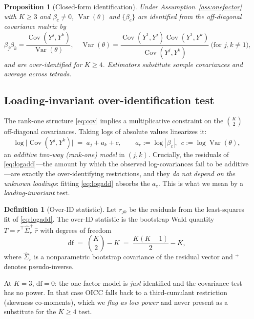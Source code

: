 \documentclass[11pt]{article}
\newtheorem{proposition}{Proposition}
\theoremstyle{definition}
\newtheorem{definition}{Definition}
\theoremstyle{remark}
\newcommand{\Var}{\operatorname{Var}}
\newcommand{\Cov}{\operatorname{Cov}}
\begin{document}
\begin{proposition}[Closed-form identification]\label{prop:ident}
Under Assumption~\ref{ass:onefactor} with $K \ge 3$ and $\beta_c \ne 0$,
$\Var(\theta)$ and $\{\beta_c\}$ are identified from the off-diagonal
covariance matrix by
\[
\beta_j\beta_k = \frac{\Cov(Y^j,Y^k)}{\Var(\theta)},\quad
\Var(\theta) = \frac{\Cov(Y^1,Y^j)\Cov(Y^1,Y^k)}{\Cov(Y^j,Y^k)}\ \text{(for } j,k\ne 1),
\]
and are \emph{over-identified} for $K\ge 4$. Estimators substitute sample
covariances and average across tetrads.
\end{proposition}

\subsection{Loading-invariant over-identification test}\label{sec:overid}

The rank-one structure \eqref{eq:cov} implies a multiplicative constraint on
the $\binom{K}{2}$ off-diagonal covariances. Taking logs of absolute values
linearizes it:
\begin{equation}\label{eq:logadd}
\log\bigl|\Cov(Y^j,Y^k)\bigr| \;=\; a_j + a_k + c,
\qquad a_c := \log|\beta_c|,\ \ c := \log\Var(\theta),
\end{equation}
an \emph{additive two-way (rank-one) model} in $(j,k)$. Crucially, the
residuals of \eqref{eq:logadd}---the amount by which the observed
log-covariances fail to be additive---are exactly the over-identifying
restrictions, and they \emph{do not depend on the unknown loadings}: fitting
\eqref{eq:logadd} absorbs the $a_c$. This is what we mean by a
\emph{loading-invariant} test.

\begin{definition}[Over-ID statistic]\label{def:overid}
Let $r_{jk}$ be the residuals from the least-squares fit of
\eqref{eq:logadd}. The over-ID statistic is the bootstrap Wald quantity
$T = \hat r^\top \widehat{\Sigma}_r^{+}\, \hat r$ with degrees of freedom
\[
\mathrm{df} \;=\; \binom{K}{2} - K \;=\; \frac{K(K-1)}{2} - K,
\]
where $\widehat{\Sigma}_r$ is a nonparametric bootstrap covariance of the
residual vector and ${}^{+}$ denotes pseudo-inverse.
\end{definition}

At $K=3$, $\mathrm{df}=0$: the one-factor model is \emph{just} identified and
the covariance test has no power. In that case OICC falls back to a
third-cumulant restriction (skewness co-moments), which we \emph{flag as
low power} and never present as a substitute for the $K\ge 4$ test.
\end{document}
